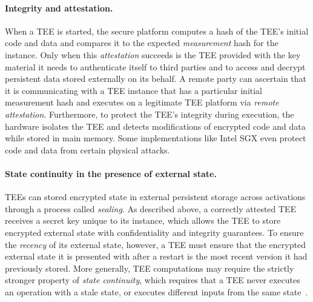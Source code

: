 \paragraph{Integrity and attestation.}
When a \ac{TEE} is started, the secure platform computes a hash of the
\ac{TEE}'s initial code and data and compares it to the expected {\em
  measurement} hash for the instance. Only when this {\em attestation}
succeeds is the \ac{TEE} provided with the key material it needs to
authenticate itself to third parties and to access and decrypt
persistent data stored externally on its behalf.  A remote party can
ascertain that it is communicating with a \ac{TEE} instance that has a
particular initial measurement hash and executes on a legitimate \ac{TEE}
platform via {\em remote attestation}.  Furthermore, to protect the
\ac{TEE}'s integrity during execution, the hardware isolates the \ac{TEE} and
detects modifications of encrypted code and data while stored in main
memory. Some implementations like Intel SGX even protect code and data
from certain physical attacks. %

\paragraph{State continuity in the presence of external state.}
\acp{TEE} can stored encrypted state in external persistent storage across
activations through a process called {\em sealing}.  As described
above, a correctly attested \ac{TEE} receives a secret key unique to its
instance, which allows the \ac{TEE} to store encrypted external state with
confidentiality and integrity guarantees.  To ensure the {\em recency}
of its external state, however, a \ac{TEE} must ensure that the encrypted
external state it is presented with after a restart is the most recent
version it had previously stored. More generally, \ac{TEE} computations may
require the strictly stronger property of {\em state continuity},
which requires that a \ac{TEE} never executes an operation with a stale
state, or executes different inputs from the same
state~\cite{ariadne}.


